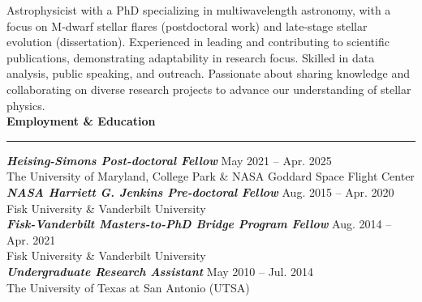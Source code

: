 \documentclass[12pt]{article}
\begin{document}
\noindent Astrophysicist with a PhD specializing in multiwavelength astronomy, with a focus on M-dwarf stellar flares (postdoctoral work) and late-stage stellar evolution (dissertation). Experienced in leading and contributing to scientific publications, demonstrating adaptability in research focus. Skilled in data analysis, public speaking, and outreach. Passionate about sharing knowledge and collaborating on diverse research projects to advance our understanding of stellar physics. \\


\noindent
{\bf Employment \& Education} \\
\vspace{-10mm}
\begin{center}
\rule{\textwidth}{0.2mm}
\end{center}
\vspace{-3mm}
\textbf{\textit{Heising-Simons Post-doctoral Fellow}}  \hfill  May 2021 -- Apr. 2025 \\
\hspace*{1cm}The University of Maryland, College Park \& NASA Goddard Space Flight Center\\
\textbf{\textit{NASA Harriett G. Jenkins Pre-doctoral Fellow}} \hfill  Aug. 2015 -- Apr. 2020\\
\hspace*{1cm}Fisk University \& Vanderbilt University \\
\noindent\textit{\textbf{Fisk-Vanderbilt Masters-to-PhD Bridge Program Fellow}} \hfill  Aug. 2014 -- Apr. 2021 \\
\hspace*{1cm}Fisk University \& Vanderbilt University \\
\textbf{\textit{Undergraduate Research Assistant}} \hfill  May 2010 -- Jul. 2014 \\
\hspace*{1cm}The University of Texas at San Antonio (UTSA) \\
\end{document}
